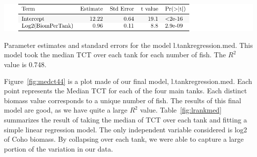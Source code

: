 \begin{table}[H]
\includegraphics{Chapter3Images/tankregressionMED.pdf}
\caption{Parameter estimates and standard errors for the model l.tankregression.med. This model took the median TCT over each tank for each number of fish. The $R^{2}$ value is 0.748. }
\label{fig:lrankmed}
\end{table}

 Figure~\ref{fig:medct44} is a plot made of our final model, l.tankregression.med. Each point represents the Median TCT for each of the four main tanks. Each distinct biomass value corresponds to a unique number of fish.  The results of this final model are good, as we have quite a large $R^{2}$ value. Table~\ref{fig:lrankmed} summarizes the result of taking the median of TCT over each tank and fitting a simple linear regression model. The only independent variable considered is log2 of Coho biomass. By collapsing over each tank, we were able to capture a large portion of the variation in our data.




